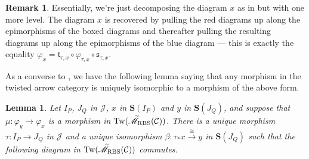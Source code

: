 \documentclass[12pt, reqno]{amsart}
\theoremstyle{plain}
\newtheorem{lemma}[theorem]{Lemma}
\theoremstyle{definition}
\newtheorem{remark}[theorem]{Remark}
\renewcommand{\phi}{\varphi}
\begin{document}
\begin{remark}
Essentially, we're just decomposing the diagram $x$ as in  but with one more level. The diagram $x$ is recovered by pulling the red diagrams up along the epimorphisms of the boxed diagrams and thereafter pulling the resulting diagrams up along the epimorphisms of the blue diagram --- this is exactly the equality $\phi_x=\mathfrak{t}_{\tau,x}\circ \phi_{\tau_*x}\circ \mathfrak{s}_{\tau,x}$.
\end{remark}

As a converse to , we have the following lemma saying that any morphism in the twisted arrow category is uniquely isomorphic to a morphism of the above form.

\begin{lemma}\label{converse to morphism in twisted arrow category}
Let $I_P$, $J_Q$ in $\mathcal{J}$, $x$ in $\mathbf{S}(I_P)$ and $y$ in $\mathbf{S}(J_Q)$, and suppose that $\mu\colon \phi_y\rightarrow \phi_x$ is a morphism in $\operatorname{Tw}(\accentset{\sim}{\mathscr{M}}_{\operatorname{RBS}}(\mathcal{C}))$. There is a unique morphism $\tau\colon I_P\rightarrow J_Q$ in $\mathcal{J}$ and a unique isomorphism $\beta\colon \tau_*x \xrightarrow{\cong} y$ in $\mathbf{S}(J_Q)$ such that the following diagram in $\operatorname{Tw}(\accentset{\sim}{\mathscr{M}}_{\operatorname{RBS}}(\mathcal{C}))$ commutes.
\begin{center}
\end{center}
\end{lemma}
\end{document}

